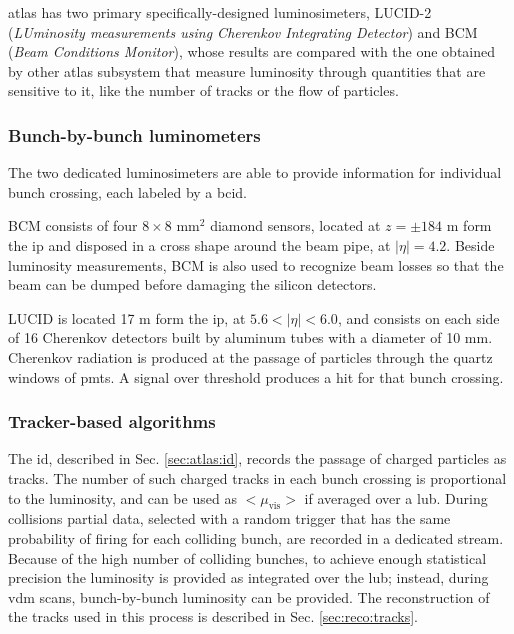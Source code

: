 \gls{atlas} has two primary specifically-designed luminosimeters, LUCID-2 (\textit{LUminosity measurements using Cherenkov Integrating Detector}) and BCM (\textit{Beam Conditions Monitor}), whose results are compared with the one obtained by other \gls{atlas} subsystem that measure luminosity through quantities that are sensitive to it, like the number of tracks or the flow of particles.

\subsubsection*{Bunch-by-bunch luminometers}

The two dedicated luminosimeters are able to provide information for individual bunch crossing, each labeled by a \gls{bcid}.

BCM consists of four $8 \times 8$ mm$^2$ diamond sensors, located at $z= \pm 184$ m form the \gls{ip} and disposed in a cross shape around the beam pipe, at $|\eta| = 4.2$. Beside luminosity measurements, BCM is also used to recognize beam losses so that the beam can be dumped before damaging the silicon detectors. 

LUCID is located 17 m form the \gls{ip}, at $5.6 < |\eta| < 6.0$, and consists on each side of 16 Cherenkov detectors built by aluminum tubes with a diameter of 10 mm. Cherenkov radiation is produced at the passage of particles through the quartz windows of \glspl{pmt}. A signal over threshold produces a hit for that bunch crossing.


\subsubsection*{Tracker-based algorithms}

The \gls{id}, described in Sec. \ref{sec:atlas:id}, records the passage of charged particles as tracks. The number of such charged tracks in each bunch crossing is proportional to the luminosity, and can be used as $<\mu_\mathrm{vis}>$ if averaged over a \gls{lub}. 
During collisions partial data, selected with a random trigger that has the same probability of firing for each colliding bunch, are recorded in a dedicated stream. Because of the high number of colliding bunches, to achieve enough statistical precision the luminosity is provided as integrated over the \gls{lub}; instead, during \gls{vdm} scans, bunch-by-bunch luminosity can be provided. 
The reconstruction of the tracks used in this process is described in Sec. \ref{sec:reco:tracks}.

